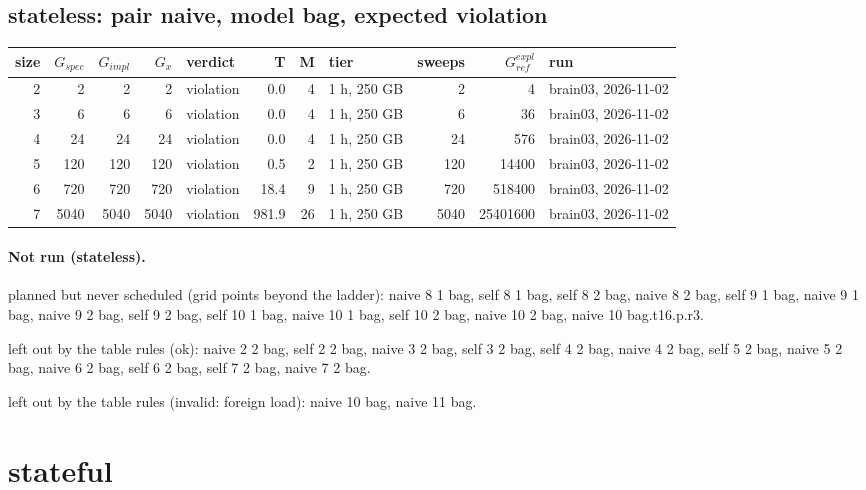 \documentclass[10pt]{article}
\begin{document}
\subsection*{stateless: pair \textsf{naive}, model bag, expected violation}
\begin{longtable}{@{}rrrrlrrlrrl@{}}
\toprule
size & $G_{\mathit{spec}}$ & $G_{\mathit{impl}}$ & $G_x$ & verdict & T & M & tier & sweeps & $G_{\mathit{ref}}^{\mathit{expl}}$ & run \\
\midrule
\endhead
\color{blue} 2 & 2 & 2 & 2 & violation & 0.0 & 4 & 1 h, 250 GB & 2 & 4 & brain03, 2026-11-02 \\
\color{blue} 3 & 6 & 6 & 6 & violation & 0.0 & 4 & 1 h, 250 GB & 6 & 36 & brain03, 2026-11-02 \\
\color{blue} 4 & 24 & 24 & 24 & violation & 0.0 & 4 & 1 h, 250 GB & 24 & 576 & brain03, 2026-11-02 \\
\color{blue} 5 & 120 & 120 & 120 & violation & 0.5 & 2 & 1 h, 250 GB & 120 & 14400 & brain03, 2026-11-02 \\
\color{blue} 6 & 720 & 720 & 720 & violation & 18.4 & 9 & 1 h, 250 GB & 720 & 518400 & brain03, 2026-11-02 \\
\color{blue} 7 & 5040 & 5040 & 5040 & violation & 981.9 & 26 & 1 h, 250 GB & 5040 & 25401600 & brain03, 2026-11-02 \\
\bottomrule
\end{longtable}
\paragraph{Not run (stateless).}
planned but never scheduled (grid points beyond the ladder): naive 8 1 bag, self 8 1 bag, self 8 2 bag, naive 8 2 bag, self 9 1 bag, naive 9 1 bag, naive 9 2 bag, self 9 2 bag, self 10 1 bag, naive 10 1 bag, self 10 2 bag, naive 10 2 bag, naive 10 bag.t16.p.r3.\par
left out by the table rules (ok): naive 2 2 bag, self 2 2 bag, naive 3 2 bag, self 3 2 bag, self 4 2 bag, naive 4 2 bag, self 5 2 bag, naive 5 2 bag, naive 6 2 bag, self 6 2 bag, self 7 2 bag, naive 7 2 bag.\par
left out by the table rules (invalid: foreign load): naive 10 bag, naive 11 bag.\par
\section*{stateful}
\end{document}
